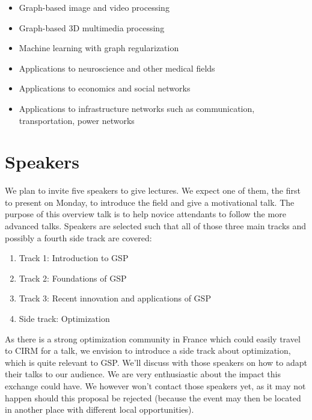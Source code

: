 \documentclass[a4paper]{scrartcl}
\begin{document}
\begin{itemize}
	\item Graph-based image and video processing
		\cite{elmoataz2008nonlocal, lezoray2008nonlocal, shahid2015fast}
	\item Graph-based 3D multimedia processing
		\cite{zhang2014point, thanou2015graph, nguyen2014compression,
		schoenenberger2015graph}
	\item Machine learning with graph regularization
		\cite{smola, belkin2005towards, zhou2004regularization,
		zhou2005learning, belkin2006manifold}
	\item Applications to neuroscience and other medical fields
		\cite{huang2015graph, hu2015spectral}
	\item Applications to economics and social networks
	\item Applications to infrastructure networks such as communication,
		transportation, power networks
		\cite{mcgraw, jain2014big, borgnat2011shared}
\end{itemize}

\section{Speakers}

We plan to invite five speakers to give lectures. We expect one of them, the
first to present on Monday, to introduce the field and give a motivational talk.
The purpose of this overview talk is to help novice attendants to follow the
more advanced talks. Speakers are selected such that all of those three
main tracks and possibly a fourth side track are covered:

\begin{enumerate}
	\setlength{\itemsep}{0pt} \setlength{\parskip}{0pt}
	\item Track 1: Introduction to GSP
	\item Track 2: Foundations of GSP
	\item Track 3: Recent innovation and applications of GSP
	\item Side track: Optimization
\end{enumerate} 

As there is a strong optimization community in France which could easily travel
to CIRM for a talk, we envision to introduce a side track about optimization,
which is quite relevant to GSP. We'll discuss with those speakers on how to
adapt their talks to our audience. We are very enthusiastic about the impact
this exchange could have. We however won't contact those speakers yet, as it may
not happen should this proposal be rejected (because the event may then be
located in another place with different local opportunities).
\end{document}
